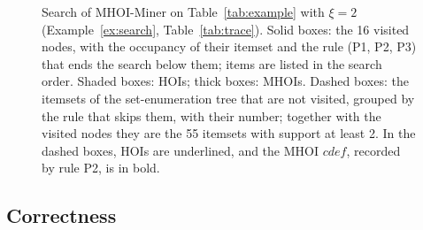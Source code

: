 \documentclass[pdflatex,sn-mathphys,Numbered]{sn-jnl}
\theoremstyle{thmstyleone}
\theoremstyle{thmstyletwo}
\theoremstyle{thmstylethree}
\newcommand{\Algo}{MHOI-Miner}
\begin{document}
\begin{figure}[t]
\caption{Search of \Algo{} on Table~\ref{tab:example} with $\xi = 2$ (Example~\ref{ex:search}, Table~\ref{tab:trace}). Solid boxes: the 16 visited nodes, with the occupancy of their itemset and the rule (P1, P2, P3) that ends the search below them; items are listed in the search order. Shaded boxes: HOIs; thick boxes: MHOIs. Dashed boxes: the itemsets of the set-enumeration tree that are not visited, grouped by the rule that skips them, with their number; together with the visited nodes they are the 55 itemsets with support at least 2. In the dashed boxes, HOIs are underlined, and the MHOI $cdef$, recorded by rule P2, is in bold.}\label{fig:search}
\end{figure}


\subsection{Correctness}
\end{document}

